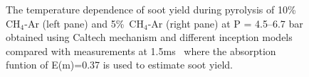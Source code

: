 \begin{figure}[H]
\begin{subfigure}[t]{0.47\textwidth}
	\end{subfigure}
	\caption{The temperature dependence of soot yield during pyrolysis of 10\%~$\mathrm{CH_4}$-Ar (left pane) and 5\%~$\mathrm{CH_4}$-Ar (right pane) at $\mathrm{P}$ = 4.5–6.7 bar obtained using Caltech mechanism and different inception models compared with measurements at 1.5ms~\cite{agafonov2016unified} where the absorption funtion of E(m)=0.37 is used to estimate soot yield.}
	\label{fig:shocktubeyield} 
\end{figure} 